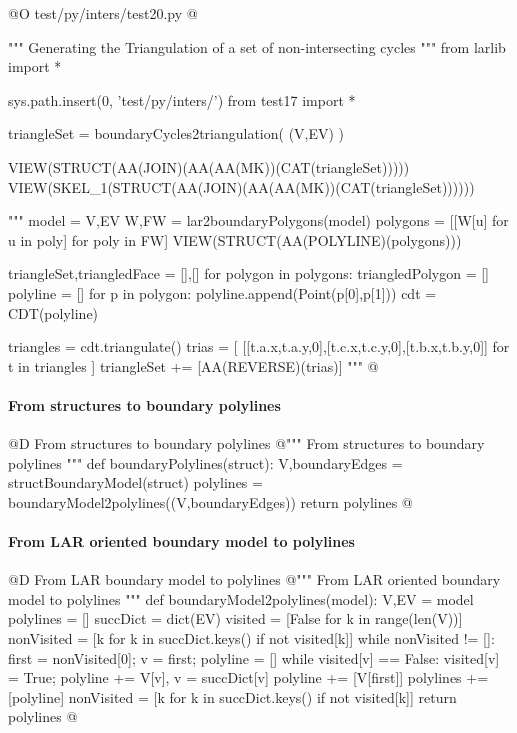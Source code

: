 \documentclass[11pt,oneside]{article}    %
\begin{document}
@O test/py/inters/test20.py
@{""" Generating the Triangulation of a set of non-intersecting cycles """
from larlib import *

sys.path.insert(0, 'test/py/inters/')
from test17 import *

triangleSet = boundaryCycles2triangulation( (V,EV) )

VIEW(STRUCT(AA(JOIN)(AA(AA(MK))(CAT(triangleSet)))))
VIEW(SKEL_1(STRUCT(AA(JOIN)(AA(AA(MK))(CAT(triangleSet))))))

"""
model = V,EV
W,FW = lar2boundaryPolygons(model)
polygons = [[W[u] for u in poly] for poly in FW]
VIEW(STRUCT(AA(POLYLINE)(polygons)))

triangleSet,triangledFace = [],[]
for polygon in polygons:  
    triangledPolygon = []
    polyline = []
    for p in polygon:
        polyline.append(Point(p[0],p[1]))
    cdt = CDT(polyline)

    triangles = cdt.triangulate()
    trias = [ [[t.a.x,t.a.y,0],[t.c.x,t.c.y,0],[t.b.x,t.b.y,0]] for t in triangles ]
    triangleSet += [AA(REVERSE)(trias)]
"""
@}


\paragraph{From structures to boundary polylines}
@D From structures to boundary polylines
@{""" From structures to boundary polylines """
def boundaryPolylines(struct):
    V,boundaryEdges = structBoundaryModel(struct)
    polylines = boundaryModel2polylines((V,boundaryEdges))
    return polylines
@}


\paragraph{From LAR oriented boundary model to polylines}
@D From LAR boundary model to polylines
@{""" From LAR oriented boundary model to polylines """
def boundaryModel2polylines(model):
    V,EV = model
    polylines = []
    succDict = dict(EV)
    visited = [False for k in range(len(V))]
    nonVisited = [k for k in succDict.keys() if not visited[k]]
    while nonVisited != []:
        first = nonVisited[0]; v = first; polyline = []
        while visited[v] == False:
            visited[v] = True; 
            polyline += V[v], 
            v = succDict[v]
        polyline += [V[first]]
        polylines += [polyline]
        nonVisited = [k for k in succDict.keys() if not visited[k]]
    return polylines
@}
\end{document}
